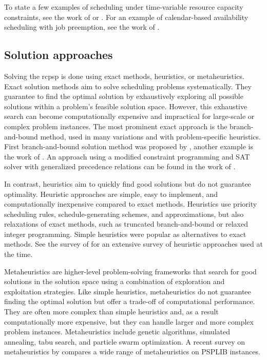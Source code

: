 To state a few examples of scheduling under time-variable resource capacity constraints,
see the work of \citet{Klein2000} or \citet{Nonobe2002}.
For an example of calendar-based availability scheduling with job preemption, see the work of \citet{Franck2001}.

\subsection{Solution approaches} \label{subsec:related-works/scheduling-the-rcpsp/solution-approaches}

Solving the \ac{rcpsp} is done using exact methods, heuristics, or metaheuristics.
Exact solution methods aim to solve scheduling problems systematically.
They guarantee to find the optimal solution by exhaustively exploring all possible solutions
within a problem's feasible solution space.
However, this exhaustive search can become computationally expensive
and impractical for large-scale or complex problem instances.
The most prominent exact approach is the branch-and-bound method,
used in many variations and with problem-specific heuristics.
First branch-and-bound solution method was proposed by \citet{Demeulemeester1992},
another example is the work of \citet{Vanhoucke2001}.
An approach using a modified constraint programming and SAT solver
with generalized precedence relations can be found in the work of \citet{Schnell2015}.

In contrast, heuristics aim to quickly find good solutions but do not guarantee optimality.
Heuristic approaches are simple, easy to implement, and computationally inexpensive compared to exact methods.
Heuristics use priority scheduling rules, schedule-generating schemes, and approximations,
but also relaxations of exact methods, such as truncated branch-and-bound or relaxed integer programming.
Simple heuristics were popular as alternatives to exact methods.
See the survey of \citet{Kolisch1999} for an extensive survey of heuristic approaches used at the time.

Metaheuristics are higher-level problem-solving frameworks that search for good solutions
in the solution space using a combination of exploration and exploitation strategies.
Like simple heuristics, metaheuristics do not guarantee finding the optimal solution
but offer a trade-off of computational performance.
They are often more complex than simple heuristics and, as a result computationally more expensive,
but they can handle larger and more complex problem instances.
Metaheuristics include genetic algorithms, simulated annealing, tabu search, and particle swarm optimization.
A recent survey on metaheuristics by \citet{Pellerin2020} compares a wide range of metaheuristics
on PSPLIB instances.

